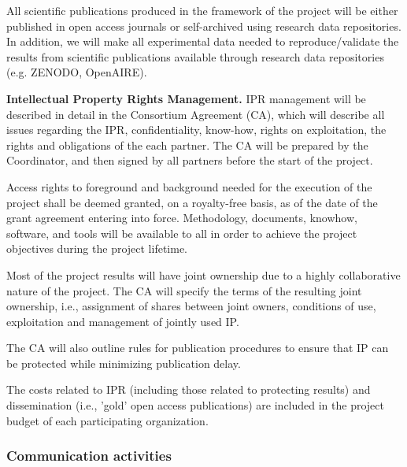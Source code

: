 All scientific publications produced in the framework of the project will be either published in open access journals or self-archived using research data repositories. In addition, we will make all experimental data needed to reproduce/validate the results from scientific publications available through research data repositories (e.g. ZENODO, OpenAIRE). 

{\bf Intellectual Property Rights Management.} IPR management will be described in detail in the Consortium Agreement (CA), which will describe all issues regarding the IPR, confidentiality, know-how, rights on exploitation, the rights and obligations of the each partner. The CA will be prepared by the Coordinator, and then signed by all partners before the start of the project. 

Access rights to foreground and background needed for the execution of the project shall be deemed granted, on a royalty-free basis, as of the date of the grant agreement entering into force. Methodology, documents, knowhow, software, and tools will be available to all in order to achieve the project objectives during the project lifetime. 

Most of the project results will have joint ownership due to a highly collaborative nature of the project. The CA will specify the terms of the resulting joint ownership, i.e., assignment of shares between joint owners, conditions of use, exploitation and management of jointly used IP. 

The CA will also outline rules for publication procedures to ensure that IP can be protected while minimizing publication delay.

The costs related to IPR (including those related to protecting results) and dissemination (i.e., 'gold' open access publications) are included in the project budget of each participating organization. 

\subsubsection{Communication activities}
\label{subsubsect:communication}


